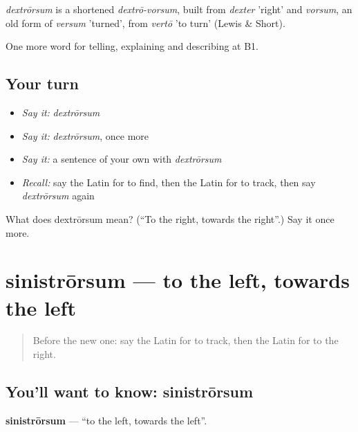 \begin{cousinweb}
\emph{dextrōrsum} is a shortened \emph{dextrō-vorsum}, built from \emph{dexter} 'right' and \emph{vorsum}, an old form of \emph{versum} 'turned', from \emph{vertō} 'to turn' (Lewis \& Short).
\end{cousinweb}

\begin{grammarlens}[title={What you've built}]
One more word for telling, explaining and describing at B1.
\end{grammarlens}

\subsection*{Your turn}
\begin{itemize}
\raggedright
  \item \emph{Say it:} \emph{dextrōrsum}
  \item \emph{Say it:} \emph{dextrōrsum}, once more
  \item \emph{Say it:} a sentence of your own with \emph{dextrōrsum}
  \item \emph{Recall:} say the Latin for to find, then the Latin for to track, then say \emph{dextrōrsum} again
\end{itemize}

\begin{tcolorbox}[breakable,colback=teal!4,colframe=teal!35!black,title={Before you move on}]
What does dextrōrsum mean? (\textquotedblleft{}To the right, towards the right\textquotedblright{}.) Say it once more.
\end{tcolorbox}
\section[sinistrōrsum]{sinistrōrsum — to the left, towards the left}

\label{lesson:LA-C454-sinistrorsum}



\begin{quote}
Before the new one: say the Latin for to track, then the Latin for to the right.
\end{quote}

\subsection*{You'll want to know: sinistrōrsum}
\textbf{sinistrōrsum} — \textquotedblleft{}to the left, towards the left\textquotedblright{}.

